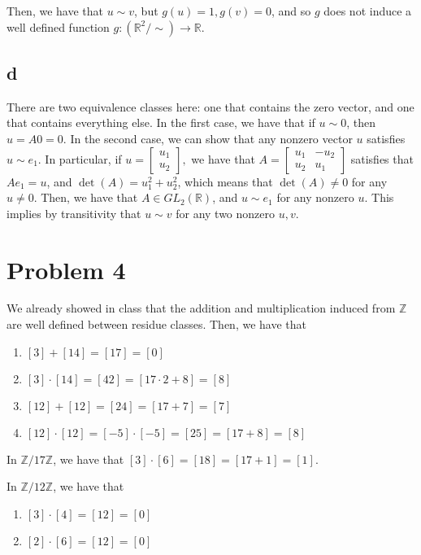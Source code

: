 \documentclass[12pt,letterpaper]{article}
\theoremstyle{definition}
\newcommand{\R}{\mathbb{R}}
\newcommand{\Z}{\mathbb{Z}}
\begin{document}
Then, we have that $u \sim v$, but $g(u) = 1, g(v) = 0$, and so $g$ does not induce a well defined function $g: (\R^2 / \sim) \rightarrow \R$.

\subsection*{d}

There are two equivalence classes here: one that contains the zero vector, and one that contains everything else. In the first case, we have that if $u \sim 0$, then $u = A0 = 0$. In the second case, we can show that any nonzero vector $u$ satisfies $u \sim e_1$. In particular, if $u = \begin{bmatrix} u_1 \\ u_2 \end{bmatrix},$ we have that $A = \begin{bmatrix} u_1& -u_2 \\ u_2 & u_1 \end{bmatrix}$ satisfies that $Ae_1 = u$, and $\det(A) = u_1^2 + u_2^2$, which means that $\det(A) \neq 0$ for any $u \neq 0$. Then, we have that $A \in GL_2(\R)$, and $u \sim e_1$ for any nonzero $u$. This implies by transitivity that $u \sim v$ for any two nonzero $u, v$.

\section*{Problem 4}

We already showed in class that the addition and multiplication induced from $\Z$ are well defined between residue classes. Then, we have that
\begin{enumerate}
  \item $[3] + [14] = [17] = [0]$
  \item $[3] \cdot [14] = [42] = [17 \cdot 2 + 8] = [8]$
  \item $[12] + [12] = [24] = [17 + 7] = [7]$
  \item $[12] \cdot [12] = [-5] \cdot [-5] = [25] = [17 + 8] = [8]$
\end{enumerate}

In $\Z / 17\Z$, we have that $[3] \cdot [6] = [18] = [17 + 1] = [1]$.

In $\Z / 12\Z$, we have that
\begin{enumerate}
  \item $[3] \cdot [4] = [12] = [0]$
  \item $[2] \cdot [6] = [12] = [0]$
\end{enumerate}
\end{document}

